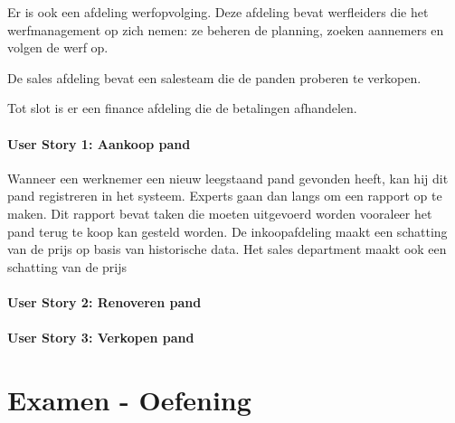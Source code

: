 \documentclass{article}
\begin{document}
Er is ook een afdeling werfopvolging. Deze afdeling bevat werfleiders die het werfmanagement op zich nemen: ze beheren de planning, zoeken aannemers en volgen de werf op.

De sales afdeling bevat een salesteam die de panden proberen te verkopen.

Tot slot is er een finance afdeling die de betalingen afhandelen.

\subsection*{User Story 1: Aankoop pand}
Wanneer een werknemer een nieuw leegstaand pand gevonden heeft, kan hij dit pand registreren in het systeem. Experts gaan dan langs om een rapport op te maken. Dit rapport bevat taken die moeten uitgevoerd worden vooraleer het pand terug te koop kan gesteld worden. De inkoopafdeling maakt een schatting van de prijs op basis van historische data. Het sales department maakt ook een schatting van de prijs
\subsection*{User Story 2: Renoveren pand}

\subsection*{User Story 3: Verkopen pand}


\part*{Examen - Oefening}
\end{document}
